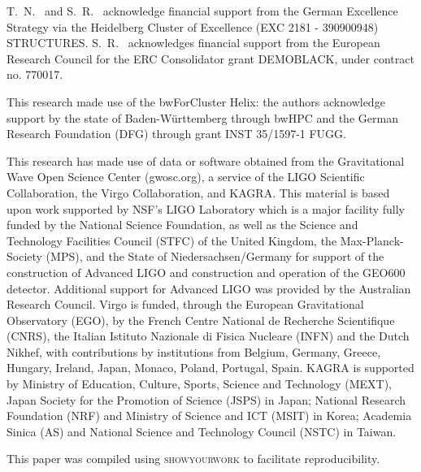 \documentclass[aps,prd,twocolumn,superscriptaddress,preprintnumbers,nofootinbib,hidelinks]{revtex4-2}
\begin{document}
\begin{acknowledgments}
T.~N.~ and S.~R.~ acknowledge financial support from the German Excellence Strategy via the Heidelberg Cluster of Excellence (EXC 2181 - 390900948) STRUCTURES.
S.~R.~ acknowledges financial support from the European Research Council for the ERC Consolidator grant DEMOBLACK, under contract no. 770017. 

This research made use of the bwForCluster Helix: the authors acknowledge support by the state of Baden-Württemberg through bwHPC and the German Research Foundation (DFG) through grant INST 35/1597-1 FUGG.

This research has made use of data or software obtained from the Gravitational Wave Open Science Center (gwosc.org), a service of the LIGO Scientific Collaboration, the Virgo Collaboration, and KAGRA. This material is based upon work supported by NSF's LIGO Laboratory which is a major facility fully funded by the National Science Foundation, as well as the Science and Technology Facilities Council (STFC) of the United Kingdom, the Max-Planck-Society (MPS), and the State of Niedersachsen/Germany for support of the construction of Advanced LIGO and construction and operation of the GEO600 detector. Additional support for Advanced LIGO was provided by the Australian Research Council. Virgo is funded, through the European Gravitational Observatory (EGO), by the French Centre National de Recherche Scientifique (CNRS), the Italian Istituto Nazionale di Fisica Nucleare (INFN) and the Dutch Nikhef, with contributions by institutions from Belgium, Germany, Greece, Hungary, Ireland, Japan, Monaco, Poland, Portugal, Spain. KAGRA is supported by Ministry of Education, Culture, Sports, Science and Technology (MEXT), Japan Society for the Promotion of Science (JSPS) in Japan; National Research Foundation (NRF) and Ministry of Science and ICT (MSIT) in Korea; Academia Sinica (AS) and National Science and Technology Council (NSTC) in Taiwan.

This paper was compiled using \textsc{showyourwork} \cite{Luger2021} to facilitate reproducibility.

\end{acknowledgments}


\end{document}
